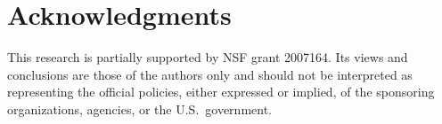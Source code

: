 \section*{Acknowledgments}
This research is partially supported by NSF grant 2007164. Its views and conclusions are those of the authors only and should not be interpreted as representing the official policies, either expressed or implied, of the sponsoring organizations, agencies, or the U.S.~government.


